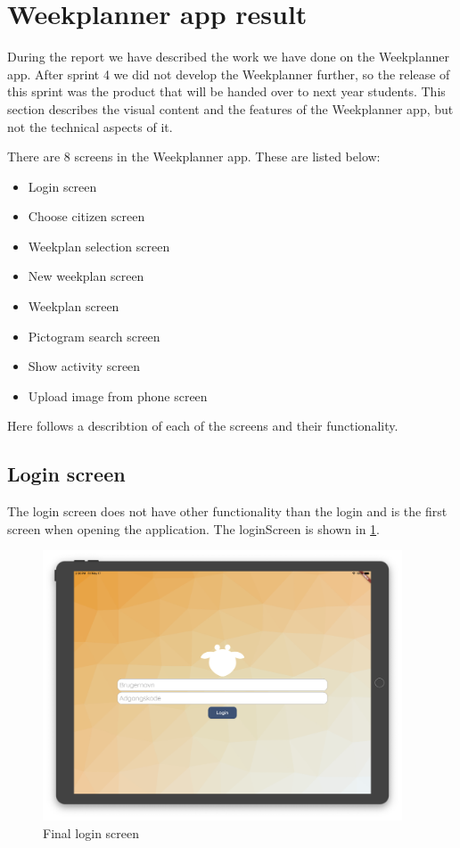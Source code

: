 \section{Weekplanner app result}
During the report we have described the work we have done on the Weekplanner app. After sprint 4 we did not develop the Weekplanner further, so the release of this sprint was the product that will be handed over to next year students. This section describes the visual content and the features of the Weekplanner app, but not the technical aspects of it.

There are 8 screens in the Weekplanner app. These are listed below:
\begin{itemize}
    \item Login screen
    \item Choose citizen screen
    \item Weekplan selection screen
    \item New weekplan screen
    \item Weekplan screen
    \item Pictogram search screen
    \item Show activity screen
    \item Upload image from phone screen
\end{itemize}

Here follows a describtion of each of the screens and their functionality.

\subsection{Login screen}
The login screen does not have other functionality than the login and is the first screen when opening the application. The loginScreen is shown in \ref{fig:FinalLoginScreen}.
\begin{figure}[H]
    \begin{center}
        \includegraphics[width=0.95\textwidth]{figures/FinalScreen/loginScreen.png}
    \end{center}
    \caption{Final login screen}
    \label{fig:FinalLoginScreen}
\end{figure}

